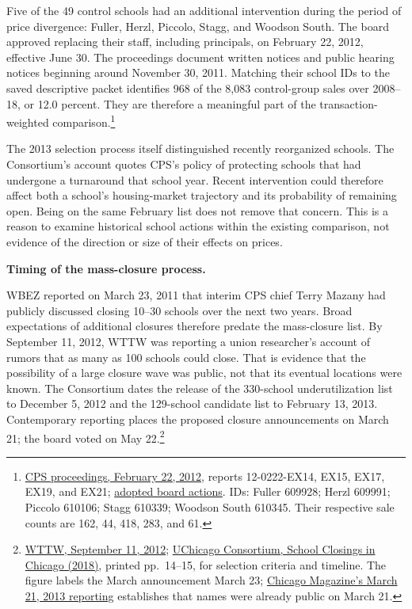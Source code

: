Five of the 49 control schools had an additional intervention during the period
of price divergence: Fuller, Herzl, Piccolo, Stagg, and Woodson South. The board
approved replacing their staff, including principals, on February 22, 2012,
effective June 30. The proceedings document written notices and public hearing
notices beginning around November 30, 2011. Matching their school IDs to the
saved descriptive packet identifies 968 of the 8,083 control-group sales over
2008--18, or 12.0 percent. They are therefore a meaningful part of the
transaction-weighted comparison.\footnote{\href{https://www.cpsboe.org/content/documents/feb2012proceedings.pdf}{CPS proceedings, February 22, 2012}, reports 12-0222-EX14, EX15, EX17, EX19, and EX21; \href{https://www.cpsboe.org/meetings/board-actions/24}{adopted board actions}. IDs: Fuller 609928; Herzl 609991; Piccolo 610106; Stagg 610339; Woodson South 610345. Their respective sale counts are 162, 44, 418, 283, and 61.}

The 2013 selection process itself distinguished recently reorganized schools.
The Consortium's account quotes CPS's policy of protecting schools that had
undergone a turnaround that school year. Recent intervention could therefore
affect both a school's housing-market trajectory and its probability of
remaining open. Being on the same February list does not remove that concern.
This is a reason to examine historical school actions within the existing
comparison, not evidence of the direction or size of their effects on prices.

\clearpage
\textbf{Timing of the mass-closure process.}

WBEZ reported on March 23, 2011 that interim CPS chief Terry Mazany had
publicly discussed closing 10--30 schools over the next two years. Broad
expectations of additional closures therefore predate the mass-closure list.
By September 11, 2012, WTTW was reporting a union researcher's account of rumors
that as many as 100 schools could close. That is evidence that the possibility
of a large closure wave was public, not that its eventual locations were known.
The Consortium dates the release of the 330-school underutilization list to
December 5, 2012 and the 129-school candidate list to February 13, 2013.
Contemporary reporting places the proposed closure announcements on March 21;
the board voted on May 22.\footnote{\href{https://news.wttw.com/2012/09/11/charter-schools-open-during-strike}{WTTW, September 11, 2012}; \href{https://files.eric.ed.gov/fulltext/ED589712.pdf}{UChicago Consortium, School Closings in Chicago (2018)}, printed pp.~14--15, for selection criteria and timeline. The figure labels the March announcement March 23; \href{https://www.chicagomag.com/city-life/march-2013/heres-the-list-of-chicago-public-schools-that-could-close/}{Chicago Magazine's March 21, 2013 reporting} establishes that names were already public on March 21.}

